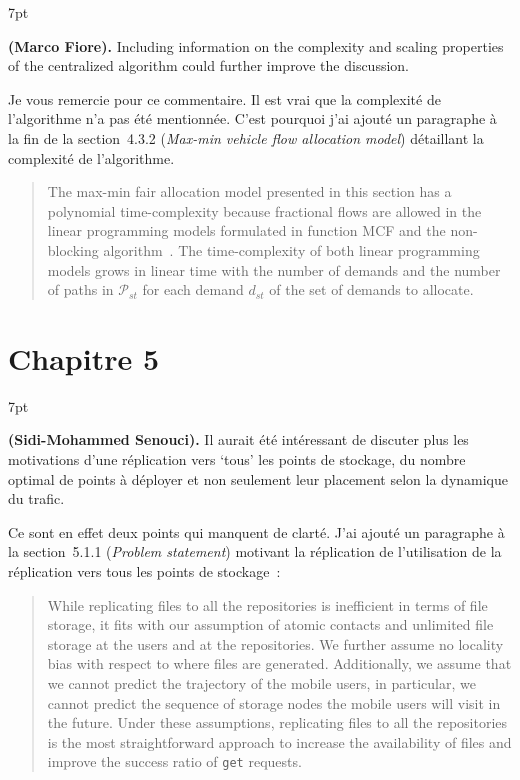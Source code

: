 \documentclass[11pt]{article}
\newenvironment{formal}{%
  \vspace*{-5pt}
  \def\FrameCommand{%
    \hspace{-5pt}%
    {\color{gray50}\vrule width 1.25pt}%
    \colorbox{formalcolor}%
  }%
  \MakeFramed{\advance\hsize-\width\FrameRestore}%
  \noindent\hspace{-4.55pt}%
  \begin{adjustwidth}{}{7pt}%
  \normalsize
  \vspace{-2pt}
}
{%
  \vspace{2pt}\end{adjustwidth}\endMakeFramed%
  \vspace*{-10pt}
}
\begin{document}
\begin{formal}
\textbf{(Marco Fiore).} Including information on the complexity and scaling properties of the centralized algorithm could further improve the discussion.
\end{formal}

Je vous remercie pour ce commentaire. Il est vrai que la complexité de l'algorithme n'a pas été mentionnée. C'est pourquoi j'ai ajouté un paragraphe à la fin de la section~4.3.2 (\textit{Max-min vehicle flow allocation model}) détaillant la complexité de l'algorithme.

\begin{quote}
The max-min fair allocation model presented in this section has a polynomial time-complexity because fractional flows are allowed in the linear programming models formulated in function \textsf{MCF} and the non-blocking algorithm~\cite{karakostas2008faster}. The time-complexity of both linear programming models grows in linear time with the number of demands and the number of paths in $\mathcal{P}_{st}$ for each demand $d_{st}$ of the set of demands to allocate.
\end{quote}

\section{Chapitre 5}

\begin{formal}
\textbf{(Sidi-Mohammed Senouci).} Il aurait été intéressant de discuter plus les motivations d’une réplication vers ‘tous’ les points de stockage, du nombre optimal de points à déployer et non seulement leur placement selon la dynamique du trafic.
\end{formal}

Ce sont en effet deux points qui manquent de clarté. J'ai ajouté un paragraphe à la section~5.1.1 (\textit{Problem statement}) motivant la réplication de l'utilisation de la réplication vers tous les points de stockage~:

\begin{quote}
While replicating files to all the repositories is inefficient in terms of file storage, it fits with our assumption of atomic contacts and unlimited file storage at the users and at the repositories. We further assume no locality bias with respect to where files are generated. Additionally, we assume that we cannot predict the trajectory of the mobile users, in particular, we cannot predict the sequence of storage nodes the mobile users will visit in the future. Under these assumptions, replicating files to all the repositories is the most straightforward approach to increase the availability of files and improve the success ratio of \texttt{get} requests.
\end{quote}
\end{document}
